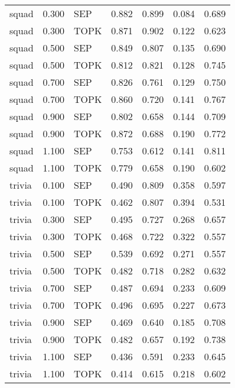 \begin{tabular}{lrlrrrr}
squad & 0.300 & SEP & 0.882 & 0.899 & 0.084 & 0.689 \\
squad & 0.300 & TOPK & 0.871 & 0.902 & 0.122 & 0.623 \\
squad & 0.500 & SEP & 0.849 & 0.807 & 0.135 & 0.690 \\
squad & 0.500 & TOPK & 0.812 & 0.821 & 0.128 & 0.745 \\
squad & 0.700 & SEP & 0.826 & 0.761 & 0.129 & 0.750 \\
squad & 0.700 & TOPK & 0.860 & 0.720 & 0.141 & 0.767 \\
squad & 0.900 & SEP & 0.802 & 0.658 & 0.144 & 0.709 \\
squad & 0.900 & TOPK & 0.872 & 0.688 & 0.190 & 0.772 \\
squad & 1.100 & SEP & 0.753 & 0.612 & 0.141 & 0.811 \\
squad & 1.100 & TOPK & 0.779 & 0.658 & 0.190 & 0.602 \\
trivia & 0.100 & SEP & 0.490 & 0.809 & 0.358 & 0.597 \\
trivia & 0.100 & TOPK & 0.462 & 0.807 & 0.394 & 0.531 \\
trivia & 0.300 & SEP & 0.495 & 0.727 & 0.268 & 0.657 \\
trivia & 0.300 & TOPK & 0.468 & 0.722 & 0.322 & 0.557 \\
trivia & 0.500 & SEP & 0.539 & 0.692 & 0.271 & 0.557 \\
trivia & 0.500 & TOPK & 0.482 & 0.718 & 0.282 & 0.632 \\
trivia & 0.700 & SEP & 0.487 & 0.694 & 0.233 & 0.609 \\
trivia & 0.700 & TOPK & 0.496 & 0.695 & 0.227 & 0.673 \\
trivia & 0.900 & SEP & 0.469 & 0.640 & 0.185 & 0.708 \\
trivia & 0.900 & TOPK & 0.482 & 0.657 & 0.192 & 0.738 \\
trivia & 1.100 & SEP & 0.436 & 0.591 & 0.233 & 0.645 \\
trivia & 1.100 & TOPK & 0.414 & 0.615 & 0.218 & 0.602 \\
\bottomrule
\end{tabular}
